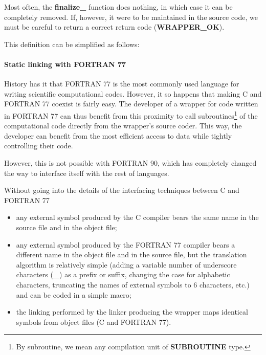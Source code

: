 Most often, the {\bf finalize\_} function does nothing, in which case it can be completely removed. If, however, it were to be maintained in the source code, we must be careful to return a correct return code ({\bf WRAPPER\_OK}).

This definition can be simplified as follows:

\paragraph{Static linking with FORTRAN 77}

History has it that FORTRAN 77 is the most commonly used language for writing scientific computational codes. However, it so happens that making C and FORTRAN 77 coexist is fairly easy. The developer of a wrapper for code written in FORTRAN 77 can thus benefit from this proximity to call subroutines\footnote{By subroutine, we mean any compilation unit of {\bf SUBROUTINE} type.} of the computational code directly from the wrapper's source coder. This way, the developer can benefit from the most efficient access to data while tightly controlling their code.

However, this is not possible with FORTRAN 90, which has completely changed the way to interface itself with the rest of languages.

Without going into the details of the interfacing techniques between C and FORTRAN 77%
\begin{itemize}
\item any external symbol produced by the C compiler bears the same name in the source file and in the object file;
\item any external symbol produced by the FORTRAN 77 compiler bears a different name in the object file and in the source file, but the translation algorithm is relatively simple (adding a variable number of underscore characters ({\bf \_}) as a prefix or suffix, changing the case for alphabetic characters, truncating the names of external symbols to 6 characters, etc.) and can be coded in a simple macro;
\item the linking performed by the linker producing the wrapper maps identical symbols from object files (C and FORTRAN 77).
\end{itemize}

